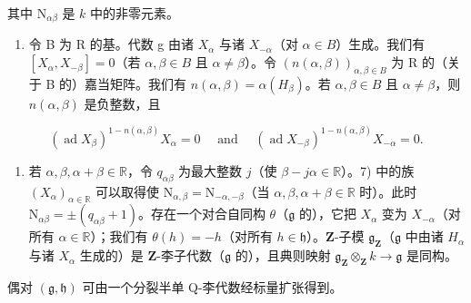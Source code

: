 其中 \(\mathrm{N}_{\alpha \beta}\) 是 \(k\) 中的非零元素。

\begin{enumerate}
\def\labelenumi{\arabic{enumi})}
\setcounter{enumi}{7}
\tightlist
\item
  令 B 为 R 的基。代数 g 由诸 \(X_{\alpha}\) 与诸 \(X_{-\alpha}\)（对 \(\alpha \in B\)）生成。我们有 \([X_{\alpha}, X_{-\beta}] = 0\)（若 \(\alpha, \beta \in B\) 且 \(\alpha \neq \beta\)）。令 \((n(\alpha, \beta))_{\alpha, \beta \in B}\) 为 R 的（关于 B 的）嘉当矩阵。我们有 \(n(\alpha, \beta) = \alpha(H_{\beta})\)。若 \(\alpha, \beta \in B\) 且 \(\alpha \neq \beta\)，则 \(n(\alpha, \beta)\) 是负整数，且
\end{enumerate}

\[
(\operatorname{ad} X _ {\beta}) ^ {1 - n (\alpha , \beta)} X _ {\alpha} = 0 \quad \text { and } \quad (\operatorname{ad} X _ {- \beta}) ^ {1 - n (\alpha , \beta)} X _ {- \alpha} = 0.
\]

\begin{enumerate}
\def\labelenumi{\arabic{enumi})}
\setcounter{enumi}{8}
\tightlist
\item
  若 \(\alpha, \beta, \alpha + \beta \in \mathbb{R}\)，令 \(q_{\alpha \beta}\) 为最大整数 \(j\)（使 \(\beta - j\alpha \in \mathbb{R}\)）。7) 中的族 \((X_{\alpha})_{\alpha \in \mathbb{R}}\) 可以取得使 \(\mathrm{N}_{\alpha, \beta} = \mathrm{N}_{-\alpha, -\beta}\)（当 \(\alpha, \beta, \alpha + \beta \in \mathbb{R}\) 时）。此时 \(\mathrm{N}_{\alpha \beta} = \pm (q_{\alpha \beta} + 1)\)。存在一个对合自同构 \(\theta\)（\(\mathfrak{g}\) 的），它把 \(X_{\alpha}\) 变为 \(X_{-\alpha}\)（对所有 \(\alpha \in \mathbb{R}\)）；我们有 \(\theta(h) = -h\)（对所有 \(h \in \mathfrak{h}\)）。\(\mathbf{Z}\)-子模 \(\mathfrak{g}_{\mathbf{Z}}\)（\(\mathfrak{g}\) 中由诸 \(H_{\alpha}\) 与诸 \(X_{\alpha}\) 生成的）是 \(\mathbf{Z}\)-李子代数（\(\mathfrak{g}\) 的），且典则映射 \(\mathfrak{g}_{\mathbf{Z}} \otimes_{\mathbf{Z}} k \to \mathfrak{g}\) 是同构。
\end{enumerate}

偶对 \((\mathfrak{g},\mathfrak{h})\) 可由一个分裂半单 Q-李代数经标量扩张得到。

